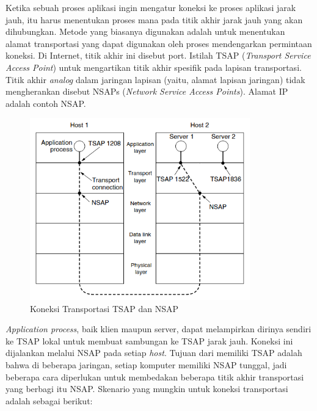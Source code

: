 Ketika sebuah proses aplikasi ingin mengatur koneksi ke proses aplikasi jarak jauh, itu harus menentukan proses mana pada titik akhir jarak jauh yang akan dihubungkan. Metode yang biasanya digunakan adalah untuk menentukan alamat transportasi yang dapat digunakan oleh proses mendengarkan permintaan koneksi. Di Internet, titik akhir ini disebut port. Istilah TSAP (\emph{Transport Service Access Point}) untuk mengartikan titik akhir spesifik pada lapisan transportasi. Titik akhir \emph{analog} dalam jaringan lapisan (yaitu, alamat lapisan jaringan) tidak mengherankan disebut NSAPs (\emph{Network Service Access Points}). Alamat IP adalah contoh NSAP.

\begin{figure}[H]
  \centering{}
	\includegraphics[width=0.85\textwidth]{gambar/TSAPs_NSAPs_and_transport_connections}
  \caption{Koneksi Transportasi TSAP dan NSAP}
\end{figure}

\emph{Application process}, baik klien maupun server, dapat melampirkan dirinya sendiri ke TSAP lokal untuk membuat sambungan ke TSAP jarak jauh. Koneksi ini dijalankan melalui NSAP pada setiap \emph{host}. Tujuan dari memiliki TSAP adalah bahwa di beberapa jaringan, setiap komputer memiliki NSAP tunggal, jadi beberapa cara diperlukan untuk membedakan beberapa titik akhir transportasi yang berbagi itu NSAP. Skenario yang mungkin untuk koneksi transportasi adalah sebagai berikut:

